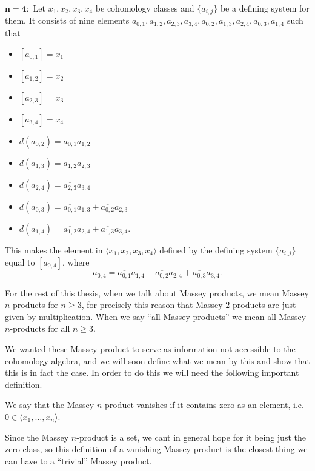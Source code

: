 $\mathbf{n=4}:$ Let $x_1, x_2, x_3, x_4$ be cohomology classes and $\{ a_{i,j} \}$ be a defining system for them. It consists of nine elements $a_{0,1}, a_{1,2}, a_{2,3}, a_{3,4}, a_{0,2}, a_{1,3}, a_{2,4}, a_{0,3}, a_{1,4}$ such that 
\begin{itemize}
    \item $[a_{0,1}] = x_1$
    \item $[a_{1,2}] = x_2$
    \item $[a_{2,3}] = x_3$
    \item $[a_{3,4}] = x_4$
    \item $d(a_{0,2}) = \overline{a_{0,1}} a_{1,2}$
    \item $d(a_{1,3}) = \overline{a_{1,2}} a_{2,3}$
    \item $d(a_{2,4}) = \overline{a_{2,3}} a_{3,4}$
    \item $d(a_{0,3}) = \overline{a_{0,1}} a_{1,3}+\overline{a_{0,2}}a_{2,3}$
    \item $d(a_{1,4}) = \overline{a_{1,2}} a_{2,4}+\overline{a_{1,3}}a_{3,4}$.
\end{itemize}
This makes the element in $\langle x_1, x_2, x_3, x_4\rangle$ defined by the defining system $\{a_{i,j}\}$ equal to $[a_{0,4}]$, where
\begin{equation*}
    a_{0,4} = \overline{a_{0,1}}a_{1,4} + \overline{a_{0,2}}a_{2,4} + \overline{a_{0,3}}a_{3,4}.
\end{equation*}

For the rest of this thesis, when we talk about Massey products, we mean Massey $n$-products for $n\geq 3$, for precisely this reason that Massey $2$-products are just given by multiplication. When we say ``all Massey products'' we mean all Massey $n$-products for all $n\geq 3$. 

We wanted these Massey product to serve as information not accessible to the cohomology algebra, and we will soon define what we mean by this and show that this is in fact the case. In order to do this we will need the following important definition. 

\begin{definition}
We say that the Massey $n$-product vanishes if it contains zero as an element, i.e. $0\in \langle x_1, \ldots, x_n\rangle$. 
\end{definition}

Since the Massey $n$-product is a set, we cant in general hope for it being just the zero class, so this definition of a vanishing Massey product is the closest thing we can have to a ``trivial'' Massey product. 

